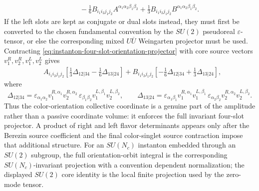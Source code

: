 \begin{proposition}
\begin{equation}
\begin{aligned}
  &\qquad
  -\frac16 B_{i_1i_2j_1j_2}A^{\alpha_1\alpha_2\beta_1\beta_2}
  +\frac13 B_{i_1i_2j_1j_2}B^{\alpha_1\alpha_2\beta_1\beta_2}.
\end{aligned}
  \label{eq:instanton-four-slot-orientation-projector}
\end{equation}
If the left slots are kept as conjugate or dual slots instead, they must first
be converted to the chosen fundamental convention by the \(SU(2)\) pseudoreal
\(\varepsilon\)-tensor, or else the corresponding mixed \(U\overline U\)
Weingarten projector must be used.  Contracting
\eqref{eq:instanton-four-slot-orientation-projector} with core source vectors
\(v_1^R,v_2^R,v_1^L,v_2^L\) gives
\begin{equation}
\begin{aligned}
  &A_{i_1i_2j_1j_2}
  \left[
    \frac13\Delta_{12|34}
    -\frac16\Delta_{13|24}
  \right]
  +
  B_{i_1i_2j_1j_2}
  \left[
    -\frac16\Delta_{12|34}
    +\frac13\Delta_{13|24}
  \right],
\end{aligned}
  \label{eq:instanton-four-slot-source-projector}
\end{equation}
where
\[
  \Delta_{12|34}
  =
  \varepsilon_{\alpha_1\alpha_2}v_1^{R,\alpha_1}v_2^{R,\alpha_2}\,
  \varepsilon_{\beta_1\beta_2}v_1^{L,\beta_1}v_2^{L,\beta_2},
  \qquad
  \Delta_{13|24}
  =
  \varepsilon_{\alpha_1\beta_1}v_1^{R,\alpha_1}v_1^{L,\beta_1}\,
  \varepsilon_{\alpha_2\beta_2}v_2^{R,\alpha_2}v_2^{L,\beta_2}.
\]
Thus the color-orientation collective coordinate is a genuine part of the
amplitude rather than a passive coordinate volume: it enforces the full
invariant four-slot projector.  A product of right and left flavor
determinants appears only after the Berezin source coefficient and the final
color-singlet source contraction impose that additional structure.  For an
\(SU(N_c)\) instanton
embedded through an \(SU(2)\) subgroup, the full orientation-orbit integral
is the corresponding \(SU(N_c)\)-invariant projection with a convention
dependent normalization; the displayed \(SU(2)\) core identity is the local
finite projection used by the zero-mode tensor.
\end{proposition}

